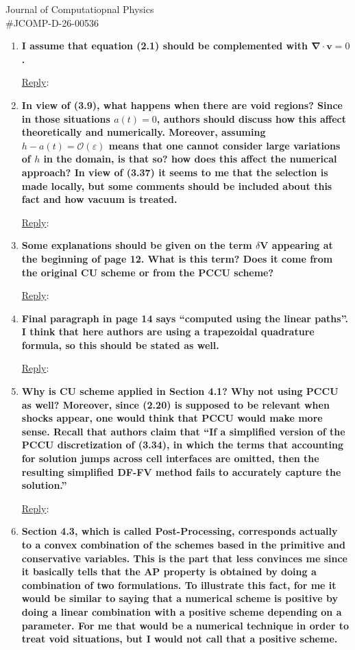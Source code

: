 \documentclass[letter,11pt]{letter}
\newcommand{\bnabla}{\bm{\nabla}}
\newcommand{\bv}{\bm{v}}
\newcommand{\bV}{\bm{V}}
\begin{document}
\begin{letter}{Journal of Computatiopnal Physics\\\#JCOMP-D-26-00536}
\begin{enumerate}
\medskip
{\sc\underline{Reply}}: 

\medskip
\item
{\bf I assume that equation (2.1) should be complemented with $\bnabla\cdot\bv = 0$.}

\medskip
{\sc\underline{Reply}}: 

\medskip
\item
{\bf In view of (3.9), what happens when there are void regions? Since in those situations $a(t)=0$, authors should discuss how this affect theoretically and numerically. Moreover, assuming $h-a(t) = \mathcal{O}(\varepsilon)$ means that one cannot consider large variations of $h$ in the domain, is that so? how does this affect the numerical approach? In view of (3.37) it seems to me that the selection is made locally, but some comments should be included about this fact and how vacuum is treated.}

\medskip
{\sc\underline{Reply}}: 

\medskip
\item
{\bf Some explanations should be given on the term $\delta\bV$ appearing at the beginning of page 12. What is this term? Does it come from the original CU scheme or from the PCCU scheme?}

\medskip
{\sc\underline{Reply}}:

\medskip
\item
{\bf Final paragraph in page 14 says ``computed using the linear paths''. I think that here authors are using a trapezoidal quadrature formula, so this should be stated as well.}

\medskip
{\sc\underline{Reply}}:

\medskip
\item
{\bf Why is CU scheme applied in Section 4.1? Why not using PCCU as well? Moreover, since (2.20) is supposed to be relevant when shocks appear, one would think that PCCU would make more sense. Recall that authors claim that ``If a simplified version of the PCCU discretization of (3.34), in which the terms that accounting for solution jumps across cell interfaces are omitted, then the resulting simplified DF-FV method fails to accurately capture the solution.''}

\medskip
{\sc\underline{Reply}}:

\medskip
\item
{\bf Section 4.3, which is called Post-Processing, corresponds actually to a convex combination of the schemes based in the primitive and conservative variables. This is the part that less convinces me since it basically tells that the AP property is obtained by doing a combination of two formulations. To illustrate this fact, for me it would be similar to saying that a numerical scheme is positive by doing a linear combination with a positive scheme depending on a parameter. For me that would be a numerical technique in order to treat void situations, but I would not call that a positive scheme.}


\end{enumerate}
\end{letter}
\end{document}
